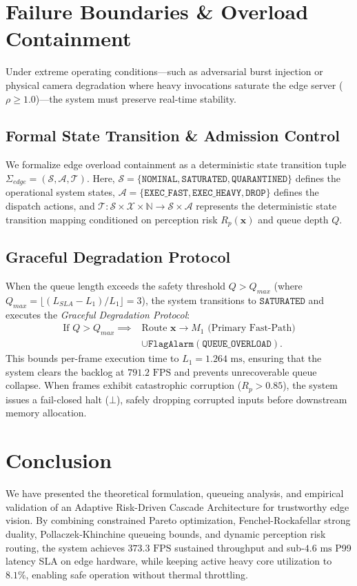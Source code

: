 \documentclass[conference]{IEEEtran}
\begin{document}
\section{Failure Boundaries \& Overload Containment}
Under extreme operating conditions—such as adversarial burst injection or physical camera degradation where heavy invocations saturate the edge server ($\rho \ge 1.0$)—the system must preserve real-time stability.

\subsection{Formal State Transition \& Admission Control}
We formalize edge overload containment as a deterministic state transition tuple $\Sigma_{edge} = (\mathcal{S}, \mathcal{A}, \mathcal{T})$. Here, $\mathcal{S} = \{\mathtt{NOMINAL}, \mathtt{SATURATED}, \mathtt{QUARANTINED}\}$ defines the operational system states, $\mathcal{A} = \{\mathtt{EXEC\_FAST}, \mathtt{EXEC\_HEAVY}, \mathtt{DROP}\}$ defines the dispatch actions, and $\mathcal{T}: \mathcal{S} \times \mathcal{X} \times \mathbb{N} \to \mathcal{S} \times \mathcal{A}$ represents the deterministic state transition mapping conditioned on perception risk $R_p(\mathbf{x})$ and queue depth $Q$.

\subsection{Graceful Degradation Protocol}
When the queue length exceeds the safety threshold $Q > Q_{max}$ (where $Q_{max} = \lfloor (L_{SLA} - L_1) / L_1 \rfloor = 3$), the system transitions to $\mathtt{SATURATED}$ and executes the \textit{Graceful Degradation Protocol}:
\begin{align}
\text{If } Q > Q_{max} \implies &\text{Route } \mathbf{x} \to M_1 \text{ (Primary Fast-Path)} \nonumber \\
&\cup \mathtt{FlagAlarm}(\mathtt{QUEUE\_OVERLOAD}).
\end{align}
This bounds per-frame execution time to $L_1 = 1.264\text{ ms}$, ensuring that the system clears the backlog at $791.2\text{ FPS}$ and prevents unrecoverable queue collapse. When frames exhibit catastrophic corruption ($R_p > 0.85$), the system issues a fail-closed halt ($\bot$), safely dropping corrupted inputs before downstream memory allocation.

\section{Conclusion}
We have presented the theoretical formulation, queueing analysis, and empirical validation of an Adaptive Risk-Driven Cascade Architecture for trustworthy edge vision. By combining constrained Pareto optimization, Fenchel-Rockafellar strong duality, Pollaczek-Khinchine queueing bounds, and dynamic perception risk routing, the system achieves $373.3\text{ FPS}$ sustained throughput and sub-$4.6\text{ ms}$ P99 latency SLA on edge hardware, while keeping active heavy core utilization to $8.1\%$, enabling safe operation without thermal throttling.
\end{document}
